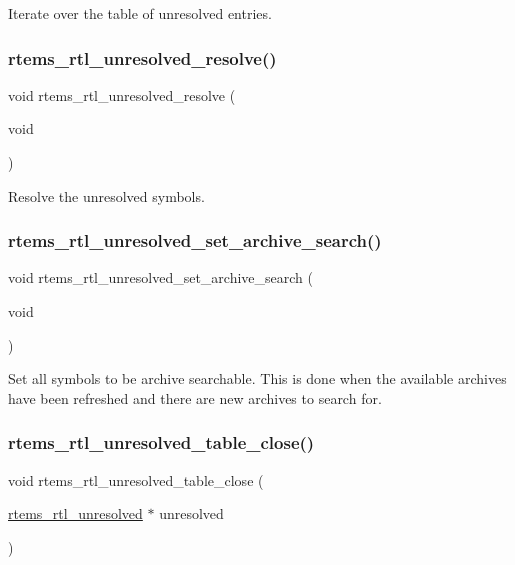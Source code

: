 Iterate over the table of unresolved entries. \mbox{\label{rtl-unresolved_8c_a2db5b6d8608d201d44d1ee5db33afd25}} 
\subsubsection{\texorpdfstring{rtems\_rtl\_unresolved\_resolve()}{rtems\_rtl\_unresolved\_resolve()}}
{\footnotesize\ttfamily void rtems\+\_\+rtl\+\_\+unresolved\+\_\+resolve (\begin{DoxyParamCaption}\item[{void}]{ }\end{DoxyParamCaption})}

Resolve the unresolved symbols. \mbox{\label{rtl-unresolved_8c_aa2b98ef7a1118212d31908c72730f486}} 
\subsubsection{\texorpdfstring{rtems\_rtl\_unresolved\_set\_archive\_search()}{rtems\_rtl\_unresolved\_set\_archive\_search()}}
{\footnotesize\ttfamily void rtems\+\_\+rtl\+\_\+unresolved\+\_\+set\+\_\+archive\+\_\+search (\begin{DoxyParamCaption}\item[{void}]{ }\end{DoxyParamCaption})}

Set all symbols to be archive searchable. This is done when the available archives have been refreshed and there are new archives to search for. \mbox{\label{rtl-unresolved_8c_afc0bcd9592d51389c269ad21d424bc73}} 
\subsubsection{\texorpdfstring{rtems\_rtl\_unresolved\_table\_close()}{rtems\_rtl\_unresolved\_table\_close()}}
{\footnotesize\ttfamily void rtems\+\_\+rtl\+\_\+unresolved\+\_\+table\+\_\+close (\begin{DoxyParamCaption}\item[{\mbox{\hyperlink{structrtems__rtl__unresolved}{rtems\+\_\+rtl\+\_\+unresolved}} $\ast$}]{unresolved }\end{DoxyParamCaption})}

